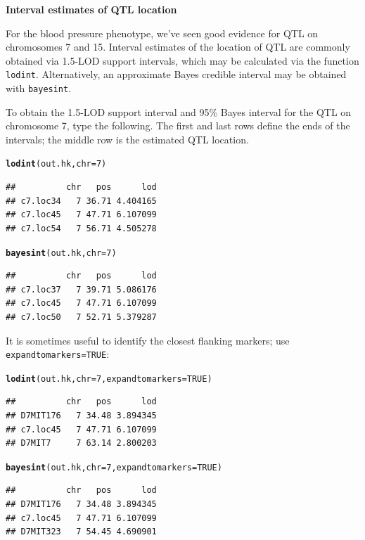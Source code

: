 \documentclass[12pt]{article}\usepackage[]{graphicx}\usepackage[]{color}
\makeatletter
\newcommand{\hlnum}[1]{\textcolor[rgb]{0.686,0.059,0.569}{#1}}%
\newcommand{\hlstd}[1]{\textcolor[rgb]{0.345,0.345,0.345}{#1}}%
\newcommand{\hlkwc}[1]{\textcolor[rgb]{0.333,0.667,0.333}{#1}}%
\newcommand{\hlkwd}[1]{\textcolor[rgb]{0.737,0.353,0.396}{\textbf{#1}}}%
\newenvironment{kframe}{%
 \def\at@end@of@kframe{}%
 \ifinner\ifhmode%
  \def\at@end@of@kframe{\end{minipage}}%
  \begin{minipage}{\columnwidth}%
 \fi\fi%
 \def\FrameCommand##1{\hskip\@totalleftmargin \hskip-\fboxsep
 \colorbox{shadecolor}{##1}\hskip-\fboxsep
     \hskip-\linewidth \hskip-\@totalleftmargin \hskip\columnwidth}%
 \MakeFramed {\advance\hsize-\width
   \@totalleftmargin\z@ \linewidth\hsize
   \@setminipage}}%
 {\par\unskip\endMakeFramed%
 \at@end@of@kframe}
\newenvironment{knitrout}{}{} %
\makeatother
\begin{document}
\bigskip
{\sffamily \textbf{Interval estimates of QTL location}}
\nopagebreak

For the blood pressure phenotype, we've seen good evidence for QTL on
chromosomes 7 and 15.  Interval estimates of the location of QTL are
commonly obtained via 1.5-LOD support intervals, which may be
calculated via the function {\tt lodint}.  Alternatively, an
approximate Bayes credible interval may be obtained with
{\tt bayesint}.

To obtain the 1.5-LOD support interval and 95\% Bayes interval
for the QTL on chromosome 7, type the following.
The first and last rows define the ends of the intervals; the middle
row is the estimated QTL location.

\begin{knitrout}
\color{fgcolor}\begin{kframe}
\begin{alltt}
\hlkwd{lodint}\hlstd{(out.hk,} \hlkwc{chr}\hlstd{=}\hlnum{7}\hlstd{)}
\end{alltt}
\begin{verbatim}
##          chr   pos      lod
## c7.loc34   7 36.71 4.404165
## c7.loc45   7 47.71 6.107099
## c7.loc54   7 56.71 4.505278
\end{verbatim}
\begin{alltt}
\hlkwd{bayesint}\hlstd{(out.hk,} \hlkwc{chr}\hlstd{=}\hlnum{7}\hlstd{)}
\end{alltt}
\begin{verbatim}
##          chr   pos      lod
## c7.loc37   7 39.71 5.086176
## c7.loc45   7 47.71 6.107099
## c7.loc50   7 52.71 5.379287
\end{verbatim}
\end{kframe}
\end{knitrout}

It is sometimes useful to identify the closest flanking markers;
use {\tt expandtomarkers=TRUE}:

\begin{knitrout}
\color{fgcolor}\begin{kframe}
\begin{alltt}
\hlkwd{lodint}\hlstd{(out.hk,} \hlkwc{chr}\hlstd{=}\hlnum{7}\hlstd{,} \hlkwc{expandtomarkers}\hlstd{=}\hlnum{TRUE}\hlstd{)}
\end{alltt}
\begin{verbatim}
##          chr   pos      lod
## D7MIT176   7 34.48 3.894345
## c7.loc45   7 47.71 6.107099
## D7MIT7     7 63.14 2.800203
\end{verbatim}
\begin{alltt}
\hlkwd{bayesint}\hlstd{(out.hk,} \hlkwc{chr}\hlstd{=}\hlnum{7}\hlstd{,} \hlkwc{expandtomarkers}\hlstd{=}\hlnum{TRUE}\hlstd{)}
\end{alltt}
\begin{verbatim}
##          chr   pos      lod
## D7MIT176   7 34.48 3.894345
## c7.loc45   7 47.71 6.107099
## D7MIT323   7 54.45 4.690901
\end{verbatim}
\end{kframe}
\end{knitrout}
\end{document}
